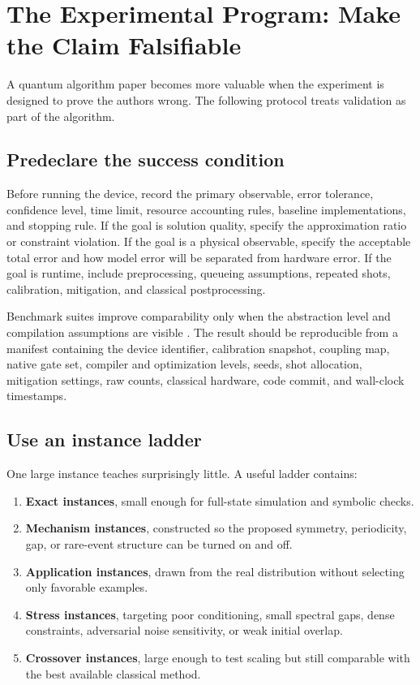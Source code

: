 \section{The Experimental Program: Make the Claim Falsifiable}\label{sec:evidence}

A quantum algorithm paper becomes more valuable when the experiment is designed to prove the authors wrong. The following protocol treats validation as part of the algorithm.

\subsection{Predeclare the success condition}

Before running the device, record the primary observable, error tolerance, confidence level, time limit, resource accounting rules, baseline implementations, and stopping rule. If the goal is solution quality, specify the approximation ratio or constraint violation. If the goal is a physical observable, specify the acceptable total error and how model error will be separated from hardware error. If the goal is runtime, include preprocessing, queueing assumptions, repeated shots, calibration, mitigation, and classical postprocessing.

Benchmark suites improve comparability only when the abstraction level and compilation assumptions are visible \citep{quetschlich2023}. The result should be reproducible from a manifest containing the device identifier, calibration snapshot, coupling map, native gate set, compiler and optimization levels, seeds, shot allocation, mitigation settings, raw counts, classical hardware, code commit, and wall-clock timestamps.

\subsection{Use an instance ladder}

One large instance teaches surprisingly little. A useful ladder contains:

\begin{enumerate}
  \item \textbf{Exact instances}, small enough for full-state simulation and symbolic checks.
  \item \textbf{Mechanism instances}, constructed so the proposed symmetry, periodicity, gap, or rare-event structure can be turned on and off.
  \item \textbf{Application instances}, drawn from the real distribution without selecting only favorable examples.
  \item \textbf{Stress instances}, targeting poor conditioning, small spectral gaps, dense constraints, adversarial noise sensitivity, or weak initial overlap.
  \item \textbf{Crossover instances}, large enough to test scaling but still comparable with the best available classical method.
\end{enumerate}

